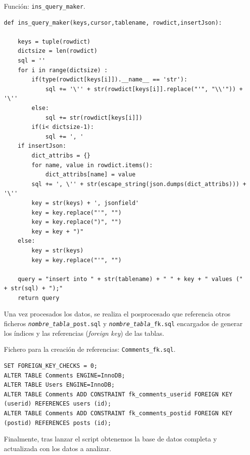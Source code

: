 \documentclass[a4paper, 12pt]{book}
\begin{document}
\begin{listing}[t]
    \caption{Función: \texttt{ins\_query\_maker}.}{}
    \label{lst:1}
    \begin{verbatim}
def ins_query_maker(keys,cursor,tablename, rowdict,insertJson):
   
    keys = tuple(rowdict)
    dictsize = len(rowdict)
    sql = ''
    for i in range(dictsize) :
        if(type(rowdict[keys[i]]).__name__ == 'str'):
            sql += '\'' + str(rowdict[keys[i]].replace("'", "\\'")) + '\''
        else:
            sql += str(rowdict[keys[i]])
        if(i< dictsize-1):
            sql += ', '
    if insertJson:
        dict_attribs = {}
        for name, value in rowdict.items():
            dict_attribs[name] = value
        sql += ', \'' + str(escape_string(json.dumps(dict_attribs))) + '\''
        key = str(keys) + ', jsonfield'
        key = key.replace("'", "")
        key = key.replace(")", "")
        key = key + ")"
    else:
        key = str(keys)
        key = key.replace("'", "")

    query = "insert into " + str(tablename) + " " + key + " values (" + str(sql) + ");"
    return query
    \end{verbatim}
\end{listing}

Una vez procesados los datos, se realiza el posprocesado que referencia otros ficheros \texttt{\emph{nombre\_tabla}\_post.sql} y \texttt{\emph{nombre\_tabla}\_fk.sql} encargados de generar los índices y las referencias (\textit{foreign key}) de las tablas.  

\begin{listing}[t]
    \caption{Fichero para la creación de referencias: \texttt{Comments\_fk.sql}.}{}
    \label{lst:2}
    \begin{verbatim}
SET FOREIGN_KEY_CHECKS = 0;
ALTER TABLE Comments ENGINE=InnoDB;
ALTER TABLE Users ENGINE=InnoDB;
ALTER TABLE Comments ADD CONSTRAINT fk_comments_userid FOREIGN KEY (userid) REFERENCES users (id);
ALTER TABLE Comments ADD CONSTRAINT fk_comments_postid FOREIGN KEY (postid) REFERENCES posts (id);
    \end{verbatim}
\end{listing}

Finalmente, tras lanzar el script obtenemos la base de datos completa y actualizada con los datos a analizar.
\end{document}
